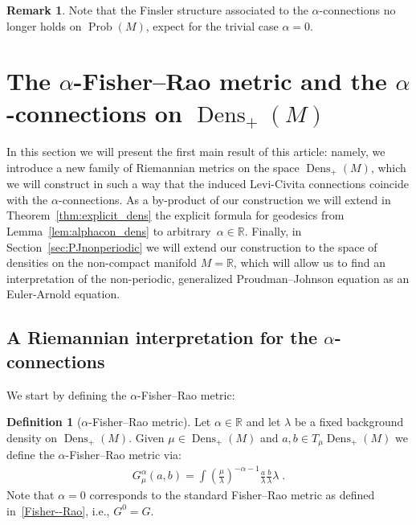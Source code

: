 \documentclass[11pt,reqno]{amsart}
\theoremstyle{definition}
\newtheorem{definition}[theorem]{Definition}
\newtheorem{remark}[theorem]{Remark}
\newcommand{\dx}{\lambda}
\newcommand{\Prob}{\operatorname{Prob}(M)}
\newcommand{\Dens}{\operatorname{Dens}_+(M)}
\begin{document}
\begin{remark}
Note that the Finsler structure associated to the $\alpha$-connections no longer holds on $\Prob$, expect for the trivial case $\alpha=0$.
\end{remark}


















\section{The $\alpha$-Fisher--Rao metric and the $\alpha$-connections on $\Dens$}\label{sec:dens}
In this section we will present the first main result of this article: namely, we introduce a new family of Riemannian metrics on the space $\Dens$, which we will construct in such a way that the induced Levi-Civita connections coincide with the $\alpha$-connections. As a by-product of our construction we will extend in Theorem~\ref{thm:explicit_dens} the explicit formula for geodesics from Lemma~\ref{lem:alphacon_dens} to arbitrary~$\alpha\in\mathbb R$. Finally, in Section~\ref{sec:PJnonperiodic} we will extend our construction to the space of densities on the non-compact manifold $M=\mathbb R$, which will allow us to find an interpretation of the non-periodic, generalized Proudman--Johnson equation as an Euler-Arnold equation. 


\subsection{A Riemannian interpretation for the $\alpha$-connections}
We  start by defining the $\alpha$-Fisher--Rao metric:
\begin{definition}[$\alpha$-Fisher--Rao metric]
Let $\alpha\in \mathbb R$ and let $\dx$ be a fixed background density on $\Dens$. Given $\mu\in \Dens$ and $a,b\in T_\mu\Dens$ we define the $\alpha$-Fisher--Rao metric via:
\begin{align}\label{p-Fisher--Rao}
G^{\alpha}_{\mu}(a,b)=\int \left(\frac{\mu}{\dx}\right)^{-\alpha-1} \frac{a}{\dx}\frac{b}{\dx}\dx\;.
\end{align}
Note that $\alpha=0$ corresponds to the standard Fisher--Rao metric as defined in~\eqref{Fisher--Rao}, i.e., $G^0=G$.
\end{definition}
\end{document}

